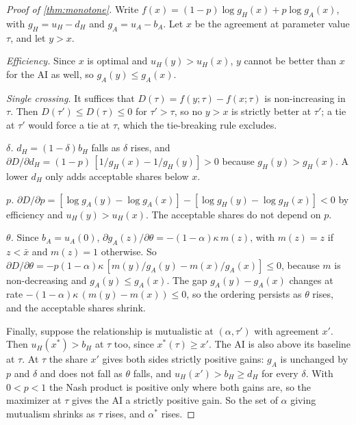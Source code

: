 \documentclass[article, 11pt, reqno]{amsart}
\theoremstyle{named}
\newcommand{\bH}{b_H}
\newcommand{\dH}{d_H}
\theoremstyle{plain}
\begin{document}
\begin{proof}[Proof of \cref{thm:monotone}]
Write $f(x) = (1-p)\log g_H(x) + p \log g_A(x)$, with $g_H = u_H - \dH$ and $g_A = u_A - b_A$. Let $x$ be the agreement at parameter value $\tau$, and let $y > x$.

\textit{Efficiency.} Since $x$ is optimal and $u_H(y) > u_H(x)$, $y$ cannot be better than $x$ for the AI as well, so $g_A(y) \le g_A(x)$.

\textit{Single crossing.} It suffices that $D(\tau) = f(y;\tau) - f(x;\tau)$ is non-increasing in $\tau$. Then $D(\tau') \le D(\tau) \le 0$ for $\tau' > \tau$, so no $y > x$ is strictly better at $\tau'$; a tie at $\tau'$ would force a tie at $\tau$, which the tie-breaking rule excludes.

\textit{$\delta$.} $\dH = (1-\delta)\bH$ falls as $\delta$ rises, and $\partial D/\partial \dH = (1-p)\,[1/g_H(x) - 1/g_H(y)] > 0$ because $g_H(y) > g_H(x)$. A lower $\dH$ only adds acceptable shares below $x$.

\textit{$p$.} $\partial D/\partial p = [\log g_A(y) - \log g_A(x)] - [\log g_H(y) - \log g_H(x)] < 0$ by efficiency and $u_H(y) > u_H(x)$. The acceptable shares do not depend on $p$.

\textit{$\theta$.} Since $b_A = u_A(0)$, $\partial g_A(z)/\partial\theta = -(1-\alpha)\kappa\, m(z)$, with $m(z) = z$ if $z < \bar x$ and $m(z) = 1$ otherwise. So $\partial D/\partial\theta = -p(1-\alpha)\kappa\,[m(y)/g_A(y) - m(x)/g_A(x)] \le 0$, because $m$ is non-decreasing and $g_A(y) \le g_A(x)$. The gap $g_A(y) - g_A(x)$ changes at rate $-(1-\alpha)\kappa\,(m(y) - m(x)) \le 0$, so the ordering persists as $\theta$ rises, and the acceptable shares shrink.

Finally, suppose the relationship is mutualistic at $(\alpha, \tau')$ with agreement $x'$. Then $u_H(x^*) > \bH$ at $\tau$ too, since $x^*(\tau) \ge x'$. The AI is also above its baseline at $\tau$. At $\tau$ the share $x'$ gives both sides strictly positive gains: $g_A$ is unchanged by $p$ and $\delta$ and does not fall as $\theta$ falls, and $u_H(x') > \bH \ge \dH$ for every $\delta$. With $0 < p < 1$ the Nash product is positive only where both gains are, so the maximizer at $\tau$ gives the AI a strictly positive gain. So the set of $\alpha$ giving mutualism shrinks as $\tau$ rises, and $\alpha^*$ rises.
\end{proof}
\end{document}
